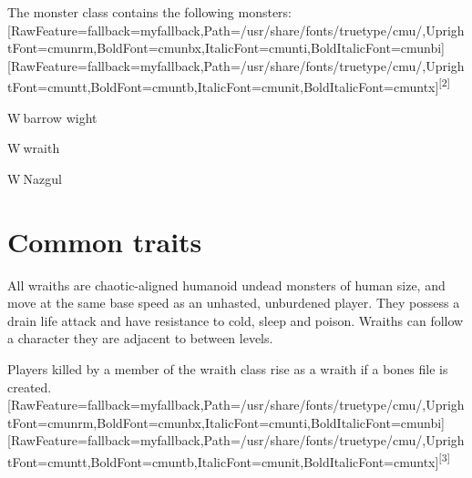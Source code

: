 The monster class contains the following monsters:\allowbreak{}\setmainfont{cmunrm.ttf}[RawFeature={fallback=myfallback},Path=/usr/share/fonts/truetype/cmu/,UprightFont=cmunrm,BoldFont=cmunbx,ItalicFont=cmunti,BoldItalicFont=cmunbi]\setmonofont{cmunrm.ttf}[RawFeature={fallback=myfallback},Path=/usr/share/fonts/truetype/cmu/,UprightFont=cmuntt,BoldFont=cmuntb,ItalicFont=cmunit,BoldItalicFont=cmuntx]\textsuperscript{{$\text{[}$}2{$\text{]}$}}




\begin{myitemize}\item{}W{\mbox{$~$}}barrow wight\footnotemark[5]
\item{}W{\mbox{$~$}}wraith\footnotemark[6]
\item{}W{\mbox{$~$}}Nazgul\footnotemark[7]
\end{myitemize}



\section{Common traits}
\label{1}
All wraiths are chaotic\footnotemark[8]-{}aligned humanoid\footnotemark[9] undead\footnotemark[10] monsters of human size\footnotemark[11], and move at the same base speed\footnotemark[12] as an unhasted, unburdened player. They possess a drain life\footnotemark[13] attack and have resistance to cold\footnotemark[14], sleep\footnotemark[15] and poison\footnotemark[16]. Wraiths can follow\footnotemark[17] a character they are adjacent to between levels.


Players killed by a member of the wraith class rise as a wraith if a bones\footnotemark[18] file is created.\allowbreak{}\setmainfont{cmunrm.ttf}[RawFeature={fallback=myfallback},Path=/usr/share/fonts/truetype/cmu/,UprightFont=cmunrm,BoldFont=cmunbx,ItalicFont=cmunti,BoldItalicFont=cmunbi]\setmonofont{cmunrm.ttf}[RawFeature={fallback=myfallback},Path=/usr/share/fonts/truetype/cmu/,UprightFont=cmuntt,BoldFont=cmuntb,ItalicFont=cmunit,BoldItalicFont=cmuntx]\textsuperscript{{$\text{[}$}3{$\text{]}$}}





